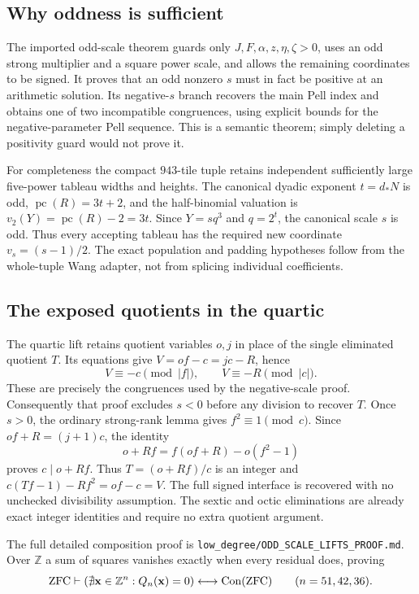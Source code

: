 \documentclass[11pt]{article}
\theoremstyle{remark}\newtheorem{remark}[theorem]{Remark}
\newcommand{\Z}{\mathbb Z}\newcommand{\N}{\mathbb N}
\newcommand{\pc}{\operatorname{pc}}\newcommand{\Norm}{\operatorname{N}}
\begin{document}
\subsection{Why oddness is sufficient}

The imported odd-scale theorem guards only
$J,F,\alpha,z,\eta,\zeta>0$, uses an odd strong multiplier and a
square power scale, and allows the remaining coordinates to be signed.
It proves that an odd nonzero $s$ must in fact be positive at an arithmetic
solution. Its negative-$s$ branch recovers the main Pell index and obtains
one of two incompatible congruences, using explicit bounds for the
negative-parameter Pell sequence. This is a semantic theorem; simply
deleting a positivity guard would not prove it.

For completeness the compact $943$-tile tuple retains independent sufficiently
large five-power tableau widths and heights. The canonical dyadic exponent
$t=d_\ast N$ is odd, $\pc(R)=3t+2$, and the half-binomial valuation is
$v_2(Y)=\pc(R)-2=3t$. Since $Y=sq^3$ and $q=2^t$, the canonical scale
$s$ is odd. Thus every accepting tableau has the required new coordinate
$v_s=(s-1)/2$. The exact population and padding hypotheses follow from
the whole-tuple Wang adapter, not from splicing individual coefficients.

\subsection{The exposed quotients in the quartic}

The quartic lift retains quotient variables $o,j$ in place of the single
eliminated quotient $T$. Its equations give
$V=of-c=jc-R$, hence
\[
 V\equiv-c\pmod{|f|},\qquad V\equiv-R\pmod{|c|}.
\]
These are precisely the congruences used by the negative-scale proof.
Consequently that proof excludes $s<0$ before any division to recover
$T$. Once $s>0$, the ordinary strong-rank lemma gives $f^2\equiv1\pmod c$.
Since $of+R=(j+1)c$, the identity
\[
 o+Rf=f(of+R)-o(f^2-1)
\]
proves $c\mid o+Rf$. Thus $T=(o+Rf)/c$ is an integer and
$c(Tf-1)-Rf^2=of-c=V$. The full signed interface is recovered with no
unchecked divisibility assumption. The sextic and octic eliminations are
already exact integer identities and require no extra quotient argument.

The full detailed composition proof is
\texttt{low\_degree/ODD\_SCALE\_LIFTS\_PROOF.md}. Over $\Z$ a sum of
squares vanishes exactly when every residual does, proving
\[
 \mathrm{ZFC}\vdash
 (\nexists\mathbf x\in\Z^n:Q_n(\mathbf x)=0)
 \longleftrightarrow\Con(\mathrm{ZFC})
 \qquad(n=51,42,36).
\]
\end{document}
